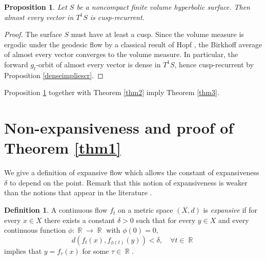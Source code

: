 \documentclass[a4paper,english,reqno]{amsart}
\DeclareMathOperator{\reals}{\mathbb{R}}
\newtheorem{proposition}{Proposition}
\theoremstyle{definition}
\newtheorem{definition}[theorem]{Definition}
\numberwithin{equation}{section}
\begin{document}
%

\begin{proposition}\label{finitevol}
	Let $S$ be a noncompact finite volume hyperbolic surface. Then almost every vector in $T^1 S$ is cusp-recurrent.
\end{proposition}

\begin{proof}
	The surface $S$ must have at least a cusp. Since the volume measure is ergodic under the geodesic flow by a classical result of Hopf \cite{Hopf1}, the Birkhoff average of almost every vector converges to the volume measure. In particular, the forward $g_t$-orbit of almost every vector is dense in $T^1S$, hence cusp-recurrent by Proposition \ref{denseimpliescr}.
\end{proof}

Proposition \ref{finitevol} together with Theorem \ref{thm2} imply Theorem \ref{thm3}.


\section{Non-expansiveness and proof of Theorem \ref{thm1}}


We give a definition of expansive flow which allows the constant of expansiveness $\delta$ to depend on the point. Remark that this notion of expansiveness is weaker than the notions that appear in the literature \cite{KatokHasselblatt1995,BowenWalters1972}.


\begin{definition}
	A continuous flow $f_t$ on a metric space $(X,d)$ is \emph{expansive} if for every $x\in X$ there exists a constant $\delta>0$ such that for every $y\in X$ and every continuous function $\phi: \reals \to \reals$ with $\phi(0) =0$,
	\[
	d(f_t(x),f_{\phi(t)} (y)) <\delta, \quad \forall t \in \reals
	\]
	implies that $y=f_{\tau} (x)$ for some $\tau\in \reals$.
\end{definition}%
\end{document}

